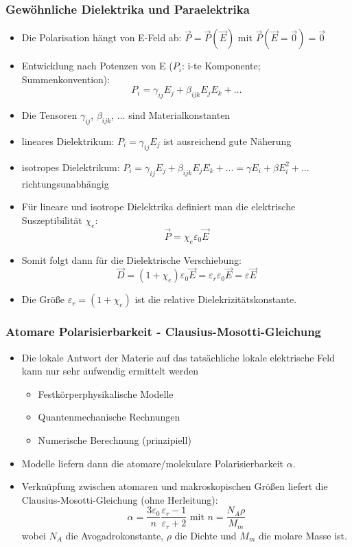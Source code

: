 \begin{frame}
\frametitle{Gewöhnliche Dielektrika und Paraelektrika}
\begin{itemize}[<+->]
\item Die Polarisation hängt von E-Feld ab: $\vec{P} = \vec{P}(\vec{E})$ mit $\vec{P}(\vec{E} = \vec{0}) = \vec{0}$
\item Entwicklung nach Potenzen von E ($P_i$: i-te Komponente; Summenkonvention):
  $$
  P_i = \gamma_{ij} E_j + \beta_{ijk} E_j E_k + \ldots
  $$
\item Die Tensoren $\gamma_{ij}$, $\beta_{ijk}$, $\ldots$ sind \alert{Materialkonstanten}
\item \alert{lineares Dielektrikum}: $P_i = \gamma_{ij} E_j$ ist ausreichend gute Näherung
\item \alert{isotropes Dielektrikum}: $P_i = \gamma_{ij} E_j + \beta_{ijk} E_j E_k + \ldots = \gamma E_i +\beta E_i^2 +\ldots$ richtungsunabhängig
\item Für lineare und isotrope Dielektrika definiert man die \alert{elektrische Suszeptibilität} $\chi_e$:
  $$
\vec{P} = \chi_e\varepsilon_0 \vec{E}
$$
\item Somit folgt dann für die Dielektrische Verschiebung:
  $$
\boxed{\vec{D} = (1+\chi_e)\varepsilon_0 \vec{E} = \varepsilon_r\varepsilon_0 \vec{E} = \varepsilon \vec{E}} 
$$
\item Die Größe $\varepsilon_r = (1+\chi_e)$ ist die \alert{relative Dielekrizitätskonstante}.
\end{itemize}
\end{frame}

\begin{frame}
\frametitle{Atomare Polarisierbarkeit - Clausius-Mosotti-Gleichung}
\begin{itemize}[<+->]
\item Die lokale Antwort der Materie auf das tatsächliche lokale elektrische Feld kann nur sehr aufwendig ermittelt werden
\begin{itemize}[<+->]
\item Festkörperphysikalische Modelle
\item Quantenmechanische Rechnungen
  \item Numerische Berechnung (prinzipiell)
\end{itemize}
\item Modelle liefern dann die \alert{atomare/molekulare Polarisierbarkeit} $\alpha$.
\item Verknüpfung zwischen atomaren und makroskopischen Größen liefert die \alert{Clausius-Mosotti-Gleichung} (ohne Herleitung):
  $$
  \boxed{\alpha = \frac{3\varepsilon_0}{n} \frac{\varepsilon_r -1}{\varepsilon_r +2} } \text{ mit } n=\frac{N_A\rho}{M_m}
  $$
  wobei $N_A$ die \alert{Avogadrokonstante}, $\rho$ die \alert{Dichte} und $M_m$ die \alert{molare Masse} ist. 
\end{itemize}
\end{frame}


